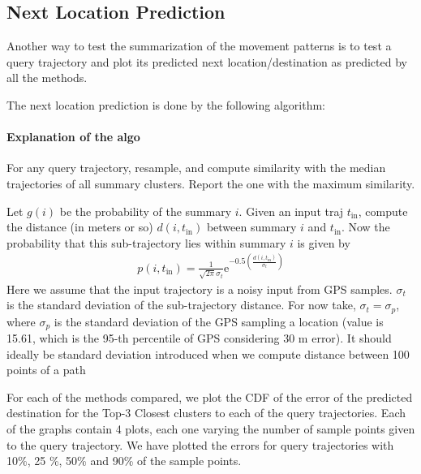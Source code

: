 \subsection{Next Location Prediction}
Another way to test the summarization of the movement patterns is to test a query trajectory and plot its predicted next location/destination as predicted by all the methods.

The next location prediction is done by the following algorithm:
\paragraph{Explanation of the algo}
For any query trajectory, resample, and compute similarity with the median trajectories of all summary clusters. Report the one with the maximum similarity. 


Let $g(i)$ be the probability of the summary $i$. Given an input traj $t_{\operatorname{in}}$, compute the distance (in meters or so) $d(i,t_{\operatorname{in}})$ between summary $i$ and $t_{\operatorname{in}}$. Now the probability that this sub-trajectory lies within summary $i$ is given by
\begin{eqnarray}
p(i,t_{\operatorname{in}}) = \frac{1}{\sqrt{2 \pi} \sigma_{t}} \mathrm{e}^{-0.5 \left( \frac{d(i,t_{\operatorname{in}})}{\sigma_{t}} \right)}
\end{eqnarray}
Here we assume that the input trajectory is a noisy input from GPS samples. $\sigma_{t}$ is the standard deviation of the sub-trajectory distance. For now take, $\sigma_{t} = \sigma_{p}$, where $\sigma_{p}$ is the standard deviation of the GPS sampling a location (value is 15.61, which is the 95-th percentile of GPS considering 30 m error). It should ideally be standard deviation introduced when we compute distance between 100 points of a path

For each of the methods compared, we plot the CDF of the error of the predicted destination for the Top-3 Closest clusters to each of the query trajectories. Each of the graphs contain 4 plots, each one varying the number of sample points given to the query trajectory. We have plotted the errors for query trajectories with 10\%, 25 \%, 50\% and 90\% of the sample points. 


